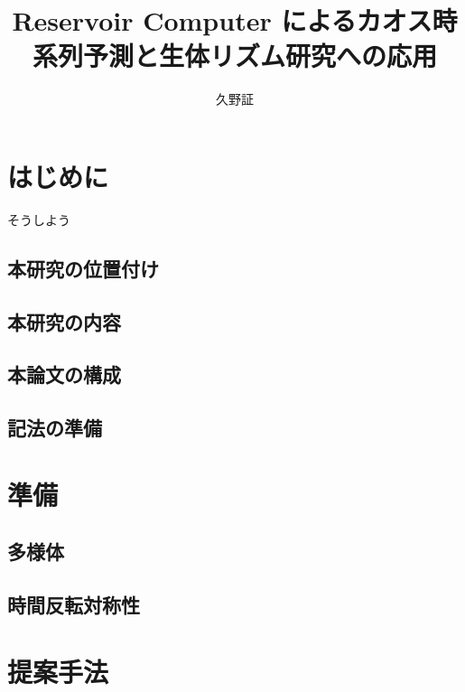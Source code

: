 \documentclass[uplatex]{suribt}
\title{Reservoir Computer によるカオス時系列予測と生体リズム研究への応用}
\author{久野証}
\begin{document}
\maketitle%

\frontmatter%
\begin{abstract}%
\end{abstract}

\tableofcontents%

\mainmatter%
\chapter{はじめに}
そうしよう

\section{本研究の位置付け}
\section{本研究の内容}

\section{本論文の構成}

\section{記法の準備}

\chapter{準備}






\section{多様体}

\section{時間反転対称性}


\chapter{提案手法}
\cite{RODRIGUES20161}
\end{document}
